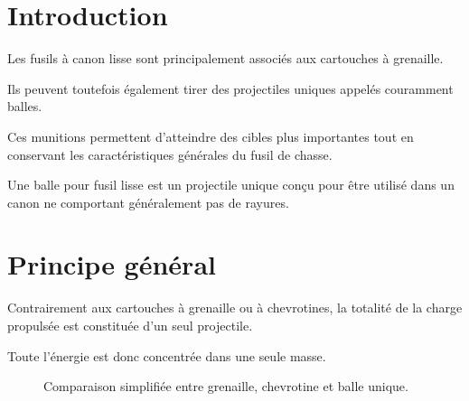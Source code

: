 
\section{Introduction}

Les fusils à canon lisse sont principalement associés aux cartouches à
grenaille.

Ils peuvent toutefois également tirer des projectiles uniques appelés
couramment balles.

Ces munitions permettent d'atteindre des cibles plus importantes tout en
conservant les caractéristiques générales du fusil de chasse.

\begin{aretenir}

Une balle pour fusil lisse est un projectile unique conçu pour être utilisé
dans un canon ne comportant généralement pas de rayures.

\end{aretenir}

\section{Principe général}

Contrairement aux cartouches à grenaille ou à chevrotines, la totalité de la
charge propulsée est constituée d'un seul projectile.

Toute l'énergie est donc concentrée dans une seule masse.

\begin{figure}[htbp]
\centering


\caption{Comparaison simplifiée entre grenaille, chevrotine et balle unique.}
\label{fig:comparaison_projectiles_chasse}

\end{figure}

